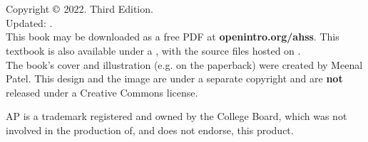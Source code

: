 \chapter*{}

\vfill


Copyright $\copyright$ 2022. Third Edition. \\
Updated: \versiondate. \\

\noindent%
This book may be downloaded as a free PDF at
    {\color{black}\textbf{openintro.org/ahss}}.
This textbook is also available under a
,
with the source files hosted on
. \\

\noindent%
The book's cover and illustration (e.g. on the paperback)
were created by Meenal Patel.
This design and the image are under a separate copyright and
are \textbf{not} released under a Creative Commons license. \\


\printlocation



\noindent%
AP\textregistered{} is a trademark registered and owned by the College Board, which was not involved in the production of, and does not endorse, this product.
